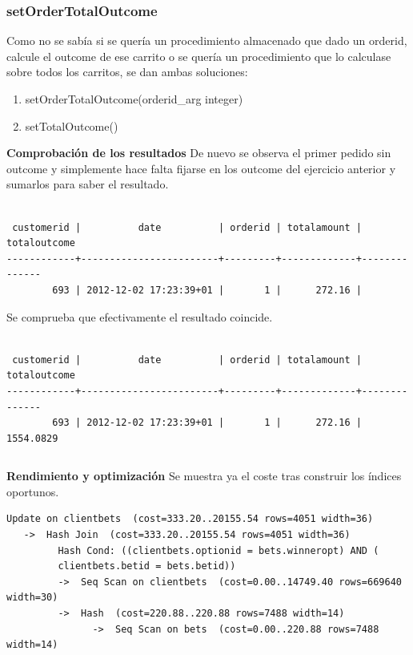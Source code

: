\documentclass{article}
\begin{document}
\subsubsection{setOrderTotalOutcome}
Como no se sabía si se quería un procedimiento almacenado que dado un orderid, calcule el outcome de ese carrito o se quería un procedimiento que lo calculase sobre todos los carritos, se dan ambas soluciones:
\begin{enumerate}
\item setOrderTotalOutcome(orderid\_arg integer)
\item setTotalOutcome()
\end{enumerate}
\textbf{Comprobación de los resultados}
De nuevo se observa el primer pedido sin outcome y simplemente hace falta fijarse en los outcome del ejercicio anterior y sumarlos para saber el resultado.
\begin{lstlisting}[style=sql]

 customerid |          date          | orderid | totalamount | totaloutcome
------------+------------------------+---------+-------------+--------------
        693 | 2012-12-02 17:23:39+01 |       1 |      272.16 |
\end{lstlisting}
Se comprueba que efectivamente el resultado coincide.
\begin{lstlisting}[style=sql]

 customerid |          date          | orderid | totalamount | totaloutcome
------------+------------------------+---------+-------------+--------------
        693 | 2012-12-02 17:23:39+01 |       1 |      272.16 |    1554.0829
\end{lstlisting}

$$\;$$

\textbf{Rendimiento y optimización}
Se muestra ya el coste tras construir los índices oportunos.
\begin{lstlisting}[style=sql]
 Update on clientbets  (cost=333.20..20155.54 rows=4051 width=36)
   ->  Hash Join  (cost=333.20..20155.54 rows=4051 width=36)
         Hash Cond: ((clientbets.optionid = bets.winneropt) AND (
         clientbets.betid = bets.betid))
         ->  Seq Scan on clientbets  (cost=0.00..14749.40 rows=669640 width=30)
         ->  Hash  (cost=220.88..220.88 rows=7488 width=14)
               ->  Seq Scan on bets  (cost=0.00..220.88 rows=7488 width=14)
\end{lstlisting}
\end{document}
